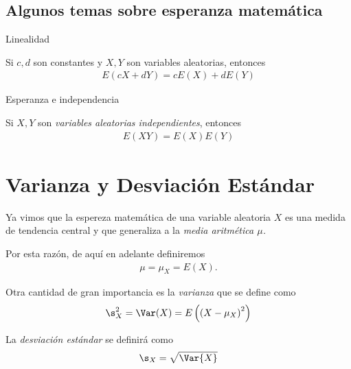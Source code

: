 \subsection{Algunos temas sobre esperanza matemática}
{Linealidad}
 \begin{thm}
  \label{thm:3.1}
  Si $c,d$ son constantes y $X,Y$ son variables aleatorias, entonces
  \begin{align}
   \label{linealidad}
   E\left( cX+dY \right)=
   cE\left( X \right)+dE\left( Y \right)
  \end{align}

 \end{thm}


{Esperanza e independencia}
 \begin{thm}
  \label{thm:3.3} Si $X,Y$ son \emph{variables aleatorias independientes}, entonces
  \begin{align}
   \label{eq:3.10}
   E\left( XY \right)=E(X)E(Y)
  \end{align}

 \end{thm}



\section{Varianza y Desviación Estándar}

 Ya vimos que la espereza matemática de una variable aleatoria $X$ es una medida de tendencia central y que generaliza a la \emph{media aritmética $\mu$.}
 

\begin{rem}
 Por esta razón, de aquí en adelante definiremos
 \begin{align*}
  \mu=\mu_{X}=E(X).
 \end{align*}

\end{rem}

 


 Otra cantidad de gran importancia es la \emph{varianza} que se define como
 \begin{align}
  \label{eq:3.11}
  \s_{X}^{2}=\Var(X)=E\left( \left( X-\mu_{X} \right)^{2} \right)
 \end{align}



 La \emph{desviación estándar} se definirá como
 \begin{align}
  \label{eq:3.12}
  \s_{X} = \sqrt{\Var{X}}
 \end{align}



